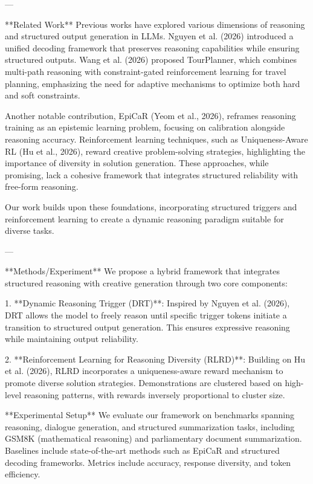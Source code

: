 ---

**Related Work**  
Previous works have explored various dimensions of reasoning and structured output generation in LLMs. Nguyen et al. (2026) introduced a unified decoding framework that preserves reasoning capabilities while ensuring structured outputs. Wang et al. (2026) proposed TourPlanner, which combines multi-path reasoning with constraint-gated reinforcement learning for travel planning, emphasizing the need for adaptive mechanisms to optimize both hard and soft constraints.

Another notable contribution, EpiCaR (Yeom et al., 2026), reframes reasoning training as an epistemic learning problem, focusing on calibration alongside reasoning accuracy. Reinforcement learning techniques, such as Uniqueness-Aware RL (Hu et al., 2026), reward creative problem-solving strategies, highlighting the importance of diversity in solution generation. These approaches, while promising, lack a cohesive framework that integrates structured reliability with free-form reasoning.

Our work builds upon these foundations, incorporating structured triggers and reinforcement learning to create a dynamic reasoning paradigm suitable for diverse tasks.

---

**Methods/Experiment**  
We propose a hybrid framework that integrates structured reasoning with creative generation through two core components:  

1. **Dynamic Reasoning Trigger (DRT)**: Inspired by Nguyen et al. (2026), DRT allows the model to freely reason until specific trigger tokens initiate a transition to structured output generation. This ensures expressive reasoning while maintaining output reliability.  

2. **Reinforcement Learning for Reasoning Diversity (RLRD)**: Building on Hu et al. (2026), RLRD incorporates a uniqueness-aware reward mechanism to promote diverse solution strategies. Demonstrations are clustered based on high-level reasoning patterns, with rewards inversely proportional to cluster size.  

**Experimental Setup**  
We evaluate our framework on benchmarks spanning reasoning, dialogue generation, and structured summarization tasks, including GSM8K (mathematical reasoning) and parliamentary document summarization. Baselines include state-of-the-art methods such as EpiCaR and structured decoding frameworks. Metrics include accuracy, response diversity, and token efficiency.

